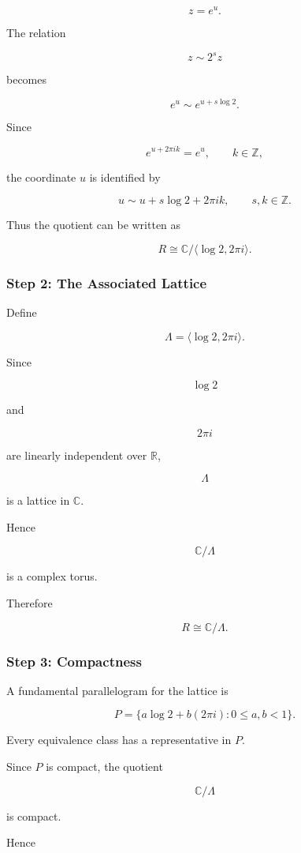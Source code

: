 \documentclass[12pt,a4paper]{article}
\theoremstyle{notespace}
\begin{document}
\[
z=e^u.
\]

The relation

\[
z\sim 2^s z
\]

becomes

\[
e^u
\sim
e^{u+s\log 2}.
\]

Since

\[
e^{u+2\pi i k}=e^u,
\qquad
k\in\mathbb Z,
\]

the coordinate \(u\) is identified by

\[
u
\sim
u+s\log 2+2\pi i k,
\qquad
s,k\in\mathbb Z.
\]

Thus the quotient can be written as

\[
R
\cong
\mathbb C/
\langle
\log 2,
2\pi i
\rangle.
\]

\subsubsection*{Step 2: The Associated Lattice}

Define

\[
\Lambda
=
\langle
\log 2,
2\pi i
\rangle.
\]

Since

\[
\log 2
\]

and

\[
2\pi i
\]

are linearly independent over \(\mathbb R\),

\[
\Lambda
\]

is a lattice in \(\mathbb C\).

Hence

\[
\mathbb C/\Lambda
\]

is a complex torus.

Therefore

\[
R
\cong
\mathbb C/\Lambda.
\]

\subsubsection*{Step 3: Compactness}

A fundamental parallelogram for the lattice is

\[
P
=
\{
a\log2+b(2\pi i):
0\le a,b<1
\}.
\]

Every equivalence class has a representative in \(P\).

Since \(P\) is compact, the quotient

\[
\mathbb C/\Lambda
\]

is compact.

Hence
\end{document}
